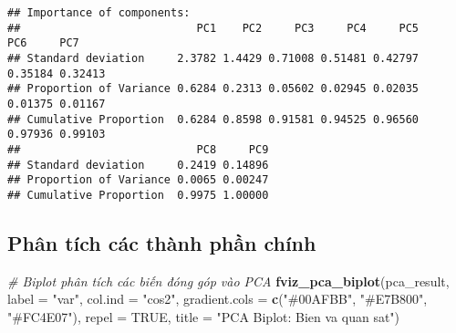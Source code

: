 \documentclass[
]{article}
\newenvironment{Shaded}{\begin{snugshade}}{\end{snugshade}}
\newcommand{\AttributeTok}[1]{\textcolor[rgb]{0.13,0.29,0.53}{#1}}
\newcommand{\CommentTok}[1]{\textcolor[rgb]{0.56,0.35,0.01}{\textit{#1}}}
\newcommand{\ConstantTok}[1]{\textcolor[rgb]{0.56,0.35,0.01}{#1}}
\newcommand{\DecValTok}[1]{\textcolor[rgb]{0.00,0.00,0.81}{#1}}
\newcommand{\FunctionTok}[1]{\textcolor[rgb]{0.13,0.29,0.53}{\textbf{#1}}}
\newcommand{\NormalTok}[1]{#1}
\newcommand{\OtherTok}[1]{\textcolor[rgb]{0.56,0.35,0.01}{#1}}
\newcommand{\SpecialCharTok}[1]{\textcolor[rgb]{0.81,0.36,0.00}{\textbf{#1}}}
\newcommand{\StringTok}[1]{\textcolor[rgb]{0.31,0.60,0.02}{#1}}
\begin{document}
\begin{Shaded}
\end{Shaded}

\begin{verbatim}
## Importance of components:
##                           PC1    PC2     PC3     PC4     PC5     PC6     PC7
## Standard deviation     2.3782 1.4429 0.71008 0.51481 0.42797 0.35184 0.32413
## Proportion of Variance 0.6284 0.2313 0.05602 0.02945 0.02035 0.01375 0.01167
## Cumulative Proportion  0.6284 0.8598 0.91581 0.94525 0.96560 0.97936 0.99103
##                           PC8     PC9
## Standard deviation     0.2419 0.14896
## Proportion of Variance 0.0065 0.00247
## Cumulative Proportion  0.9975 1.00000
\end{verbatim}

\subsection{Phân tích các thành phần
chính}\label{phuxe2n-tuxedch-cuxe1c-thuxe0nh-phux1ea7n-chuxednh}

\begin{Shaded}
\begin{Highlighting}[]
\CommentTok{\# Biplot phân tích các biến đóng góp vào PCA}
\FunctionTok{fviz\_pca\_biplot}\NormalTok{(pca\_result, }
                \AttributeTok{label =} \StringTok{"var"}\NormalTok{,}
                \AttributeTok{col.ind =} \StringTok{"cos2"}\NormalTok{,}
                \AttributeTok{gradient.cols =} \FunctionTok{c}\NormalTok{(}\StringTok{"\#00AFBB"}\NormalTok{, }\StringTok{"\#E7B800"}\NormalTok{, }\StringTok{"\#FC4E07"}\NormalTok{),}
                \AttributeTok{repel =} \ConstantTok{TRUE}\NormalTok{,}
                \AttributeTok{title =} \StringTok{"PCA Biplot: Bien va quan sat"}\NormalTok{)}
\end{Highlighting}
\end{Shaded}
\end{document}
